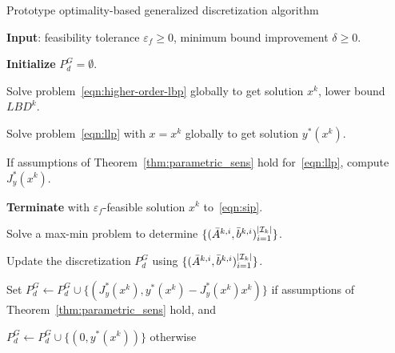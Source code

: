 \documentclass{article}
\DeclarePairedDelimiter\abs{\lvert}{\rvert}%
\newcommand{\1}[1]{\mathds{1}\left[#1\right]}
\begin{document}
\begin{algorithm}[t]
\caption{Prototype optimality-based generalized discretization algorithm}
\label{alg:prototype_genl_disc}
{
\begin{algorithmic}[1]
\State \textbf{Input}: feasibility tolerance $\varepsilon_{f} \geq 0$, minimum bound improvement $\delta \geq 0$.

\State \textbf{Initialize} $P^G_d = \emptyset$.



\State Solve problem~\eqref{eqn:higher-order-lbp} globally to get solution $x^k$, lower bound $LBD^k$.

\State Solve problem~\eqref{eqn:llp} with $x = x^k$ globally to get solution $y^*(x^k)$.

\State If assumptions of Theorem~\ref{thm:parametric_sens} hold for~\eqref{eqn:llp}, compute $J^*_y(x^k)$.


\State \textbf{Terminate} with $\varepsilon_f$-feasible solution $x^k$ to~\eqref{eqn:sip}.

\Else

\State Solve a max-min problem to determine $\{(\bar{A}^{k,i},\bar{b}^{k,i})_{i=1}^{\abs{\mathcal{I}_k}}\}$.


\vspace*{0.03in}

\State Update the discretization $P^G_d$ using $\{(\bar{A}^{k,i},\bar{b}^{k,i})_{i=1}^{\abs{\mathcal{I}_k}}\}$.

\Else

\State Set $P^G_d \leftarrow P^G_d \cup \{ (J^*_y(x^k), y^*(x^k) - J^*_y(x^k) x^k) \}$ if assumptions of Theorem~\ref{thm:parametric_sens} hold, and 

\Statex \hspace*{0.6in} $P^G_d \leftarrow P^G_d \cup \{ (0, y^*(x^k)) \}$ otherwise


\EndIf


\vspace*{0.03in}
\EndIf



\EndFor

\end{algorithmic}
}
\end{algorithm}
\end{document}
